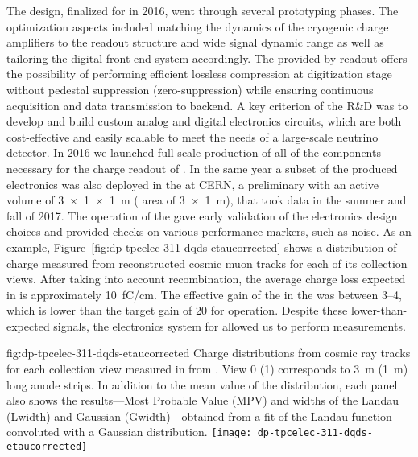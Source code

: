 The design, finalized for  in 2016, went through several prototyping phases. The optimization aspects included matching the dynamics of the cryogenic charge amplifiers to the  readout structure and wide signal dynamic range as well as tailoring the digital front-end system accordingly. The  provided by  readout offers the possibility of performing efficient lossless compression at digitization stage without pedestal suppression (zero-suppression) while ensuring continuous acquisition and data transmission to  backend. A key criterion of the R\&D was to develop and build custom analog and digital electronics circuits, which are both cost-effective and easily scalable to meet the needs of a large-scale neutrino  detector. In 2016 we launched full-scale production of all of the components necessary for the charge readout of . In the same year a subset of the produced electronics was also deployed in the  at CERN, a preliminary \dual \lartpc with an active volume  of \SI[product-units=power]{3x1x1}{m} ( area of \SI[product-units=power]{3x1}{m}), that took data in the summer and fall of 2017. The operation of the  \cite{Aimard:2018yxp} gave early validation of the electronics  design choices and provided checks on various performance markers, such as noise. As an example, Figure~\ref{fig:dp-tpcelec-311-dqds-etaucorrected} shows a distribution of charge measured from reconstructed cosmic muon tracks for each of its collection views. After taking into account recombination, the average  charge loss expected in \lar is approximately \SI{10}{\femto\coulomb/\cm}. The effective gain of the  in the  was between \numrange{3}{4}, which is lower than the target gain of \num{20} for  operation. Despite these lower-than-expected signals, the electronics system for  allowed us to perform measurements. 

\begin{dunefigure}{fig:dp-tpcelec-311-dqds-etaucorrected}
{Charge distributions from cosmic ray tracks for each collection view measured in   from \cite{Aimard:2018yxp}. View \num{0} (\num{1}) corresponds to \SI{3}{\meter} (\SI{1}{\meter}) long anode strips. In addition to the mean value of the distribution, each panel also shows the results---Most Probable Value (MPV) and widths of the Landau (Lwidth) and Gaussian (Gwidth)---obtained from a fit of the Landau function convoluted with a Gaussian distribution.}
\texttt{[image: dp-tpcelec-311-dqds-etaucorrected]}
\end{dunefigure}

